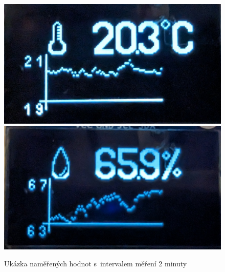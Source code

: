 \documentclass[a4paper, 12pt]{article}
\begin{document}
\begin{figure}[H]
    \centering
    \includegraphics{src/temp.png} \\
    \includegraphics{src/humi.png}
    \caption{Ukázka naměřených hodnot s~intervalem měření 2 minuty}
\end{figure}

\newpage
\end{document}
